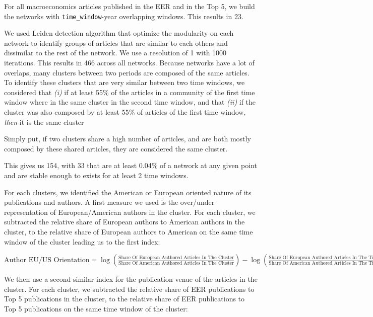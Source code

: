\documentclass[]{elsarticle} %
\begin{document}
For all macroeconomics articles published in the EER and in the Top 5,
we build the networks with \texttt{time\_window}-year overlapping
windows. This results in 23.

We used Leiden detection algorithm \citep{traag2019} that optimize the
modularity on each network to identify groups of articles that are
similar to each others and dissimilar to the rest of the network. We use
a resolution of 1 with 1000 iterations. This results in 466 across all
networks. Because networks have a lot of overlaps, many clusters between
two periods are composed of the same articles. To identify these
clusters that are very similar between two time windows, we considered
that \emph{(i)} if at least 55\% of the articles in a community of the
first time window where in the same cluster in the second time window,
and that \emph{(ii)} if the cluster was also composed by at least 55\%
of articles of the first time window, \emph{then} it is the same cluster

Simply put, if two clusters share a high number of articles, and are
both mostly composed by these shared articles, they are considered the
same cluster.

This gives us 154, with 33 that are at least 0.04\% of a network at any
given point and are stable enough to exists for at least 2 time windows.

For each clusters, we identified the American or European oriented
nature of its publications and authors. A first measure we used is the
over/under representation of European/American authors in the cluster.
For each cluster, we subtracted the relative share of European authors
to American authors in the cluster, to the relative share of European
authors to American on the same time window of the cluster leading us to
the first index:\newline

\(\text{Author EU/US Orientation}=\log(\frac{\text{Share Of European Authored Articles In The Cluster}}{\text{Share Of American Authored Articles In The Cluster}})-\log(\frac{\text{Share Of European Authored Articles In The Time Window}}{\text{Share Of American Authored Articles In The Time Window}})\)\newline

We then use a second similar index for the publication venue of the
articles in the cluster. For each cluster, we subtracted the relative
share of EER publications to Top 5 publications in the cluster, to the
relative share of EER publications to Top 5 publications on the same
time window of the cluster:\newline
\end{document}
